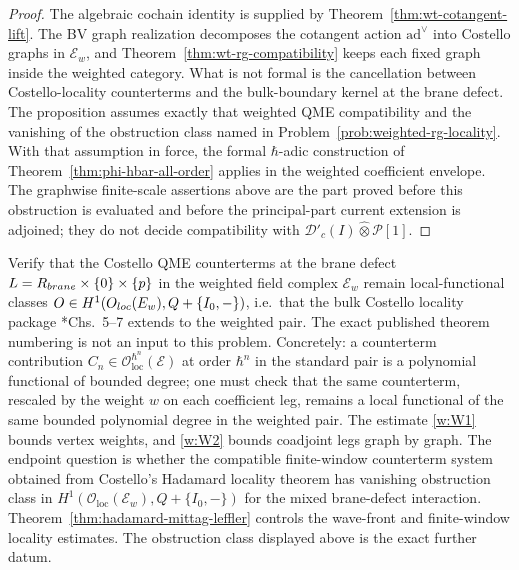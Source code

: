 \begin{proof}
  The algebraic cochain identity is supplied by
  Theorem~\ref{thm:wt-cotangent-lift}.  The BV graph realization
  decomposes the cotangent action $\mathrm{ad}^\vee$ into Costello
  graphs in $\mathcal E_w$, and
  Theorem~\ref{thm:wt-rg-compatibility} keeps each fixed graph inside
  the weighted category.  What is not formal is the cancellation
  between Costello-locality counterterms and the bulk-boundary kernel
  at the brane defect.  The proposition assumes exactly that weighted
  QME compatibility and the vanishing of the obstruction class named in
  Problem~\ref{prob:weighted-rg-locality}.  With that assumption in
  force, the formal $\hbar$-adic construction of
  Theorem~\ref{thm:phi-hbar-all-order} applies in the weighted
  coefficient envelope.  The graphwise finite-scale assertions above are
  the part proved before this obstruction is evaluated and before the
  principal-part current extension is adjoined; they do not decide
  compatibility with
  \(\mathcal D'_c(I)\widehat\otimes\mathcal P[1]\).
\end{proof}

\begin{prob}\label{prob:weighted-rg-locality}
  Verify that the Costello QME counterterms at the brane defect
  \(L=R_{brane}\times\{0\}\times\{p\}\) in the weighted field complex $\mathcal E_w$ remain
  local-functional classes
  $O\in H^1(O_{loc}(E_w),Q+\{I_0,-\})$,
  i.e.\ that the bulk Costello locality package
  \cite{costello-renormalization}*{Chs.~5--7} extends to the
  weighted pair. The exact published theorem numbering is not an
  input to this problem. Concretely: a counterterm contribution
  $C_n\in\mathcal O_{\mathrm{loc}}^{\hbar^n}(\mathcal E)$ at order
  $\hbar^n$ in the standard pair is a polynomial functional of
  bounded degree; one must check that the same counterterm,
  rescaled by the weight $w$ on each coefficient leg, remains a
  local functional of the same bounded polynomial degree in the
  weighted pair. The estimate \ref{w:W1} bounds vertex weights, and
  \ref{w:W2} bounds coadjoint legs graph by graph.  The endpoint
  question is whether the compatible finite-window counterterm system
  obtained from Costello's Hadamard locality theorem has vanishing
  obstruction class in
  $H^1(\mathcal O_{\mathrm{loc}}(\mathcal E_w),Q+\{I_0,-\})$ for the
  mixed brane-defect interaction.
  Theorem~\ref{thm:hadamard-mittag-leffler} controls the wave-front
  and finite-window locality estimates.  The obstruction class displayed
  above is the exact further datum.
\end{prob}

